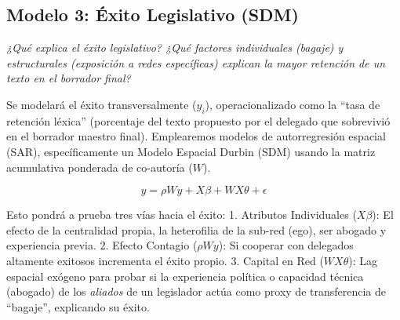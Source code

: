 \documentclass[11pt,a4paper]{article}
\begin{document}
\subsection{Modelo 3: Éxito Legislativo (SDM)}
\textit{¿Qué explica el éxito legislativo? ¿Qué factores individuales (bagaje) y estructurales (exposición a redes específicas) explican la mayor retención de un texto en el borrador final?}

Se modelará el éxito transversalmente ($y_i$), operacionalizado como la ``tasa de retención léxica'' (porcentaje del texto propuesto por el delegado que sobrevivió en el borrador maestro final). Emplearemos modelos de autorregresión espacial (SAR), específicamente un Modelo Espacial Durbin (SDM) usando la matriz acumulativa ponderada de co-autoría ($W$).

$$ y = \rho W y + X \beta + W X \theta + \epsilon $$

Esto pondrá a prueba tres vías hacia el éxito:
1. Atributos Individuales ($X \beta$): El efecto de la centralidad propia, la heterofilia de la sub-red (ego), ser abogado y experiencia previa.
2. Efecto Contagio ($\rho W y$): Si cooperar con delegados altamente exitosos incrementa el éxito propio.
3. Capital en Red ($W X \theta$): Lag espacial exógeno para probar si la experiencia política o capacidad técnica (abogado) de los \textit{aliados} de un legislador actúa como proxy de transferencia de ``bagaje'', explicando su éxito.
\end{document}
